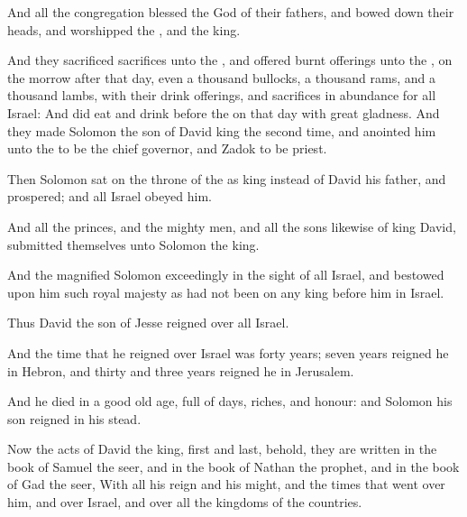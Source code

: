 And all the congregation blessed the \LORD God of their fathers, and bowed down their heads, and worshipped the \LORD, and the king.

\verse And they sacrificed sacrifices unto the \LORD, and offered burnt offerings unto the \LORD, on the morrow after that day, even a thousand bullocks, a thousand rams, and a thousand lambs, with their drink offerings, and sacrifices in abundance for all Israel: \verse And did eat and drink before the \LORD on that day with great gladness. And they made Solomon the son of David king the second time, and anointed him unto the \LORD to be the chief governor, and Zadok to be priest.

\verse Then Solomon sat on the throne of the \LORD as king instead of David his father, and prospered; and all Israel obeyed him.

\verse And all the princes, and the mighty men, and all the sons likewise of king David, submitted themselves unto Solomon the king.

\verse And the \LORD magnified Solomon exceedingly in the sight of all Israel, and bestowed upon him such royal majesty as had not been on any king before him in Israel.

\verse Thus David the son of Jesse reigned over all Israel.

\verse And the time that he reigned over Israel was forty years; seven years reigned he in Hebron, and thirty and three years reigned he in Jerusalem.

\verse And he died in a good old age, full of days, riches, and honour: and Solomon his son reigned in his stead.

\verse Now the acts of David the king, first and last, behold, they are written in the book of Samuel the seer, and in the book of Nathan the prophet, and in the book of Gad the seer, \verse With all his reign and his might, and the times that went over him, and over Israel, and over all the kingdoms of the countries.

